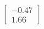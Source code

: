\documentclass[preview]{standalone}
\begin{document}
\begin{align*}
\begin{bmatrix} -0.47 \\ 1.66 \end{bmatrix}
\end{align*}
\end{document}
